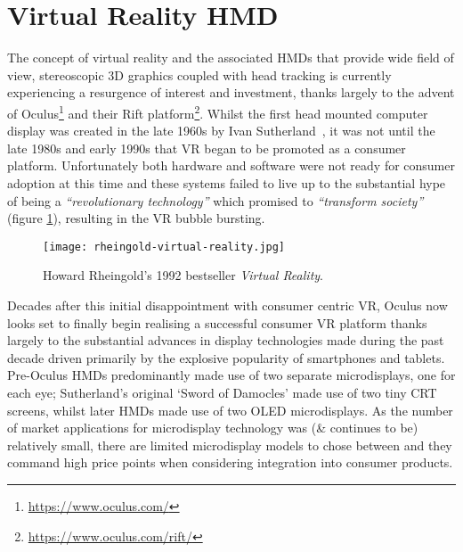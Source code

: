 
\section{Virtual Reality HMD}
The concept of virtual reality and the associated HMDs that provide wide field of view, stereoscopic 3D graphics coupled with head tracking is currently experiencing a resurgence of interest and investment, thanks largely to the advent of Oculus\footnote{\url{https://www.oculus.com/}} and their Rift platform\footnote{\url{https://www.oculus.com/rift/}}. Whilst the first head mounted computer display was created in the late 1960s by Ivan Sutherland~\cite{Rheingold1992}, it was not until the late 1980s and early 1990s that VR began to be promoted as a consumer platform. Unfortunately both hardware and software were not ready for consumer adoption at this time and these systems failed to live up to the substantial hype of being a \textit{``revolutionary technology''} which promised to \textit{``transform society''} (figure \ref{rheingold-virtual-reality.jpg}), resulting in the VR bubble bursting.

\begin{figure}[h]
	\begin{center}
		\texttt{[image: rheingold-virtual-reality.jpg]}
		\caption{Howard Rheingold's 1992 bestseller \textit{Virtual Reality}.}
		\label{rheingold-virtual-reality.jpg}
	\end{center}
\end{figure}

Decades after this initial disappointment with consumer centric VR, Oculus now looks set to finally begin realising a successful consumer VR platform thanks largely to the substantial advances in display technologies made during the past decade driven primarily by the explosive popularity of smartphones and tablets. Pre-Oculus HMDs predominantly made use of two separate microdisplays, one for each eye; Sutherland's original `Sword of Damocles' made use of two tiny CRT screens, whilst later HMDs made use of two OLED microdisplays. As the number of market applications for microdisplay technology was (\& continues to be) relatively small, there are limited microdisplay models to chose between and they command high price points when considering integration into consumer products.

